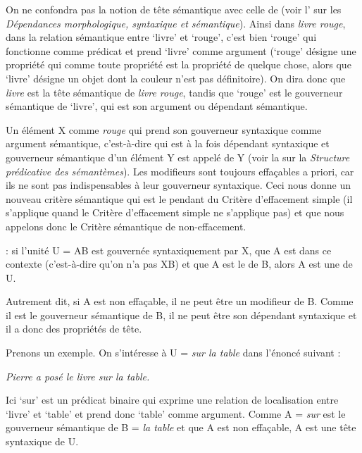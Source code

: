 On ne confondra pas la notion de tête sémantique avec celle de  (voir l’ sur les \textit{Dépendances morphologique, syntaxique et sémantique}). 
Ainsi dans \textit{livre rouge}, dans la relation sémantique entre ‘livre’ et ‘rouge’, c’est bien ‘rouge’ qui fonctionne comme prédicat et prend ‘livre’ comme argument (‘rouge’ désigne une propriété qui comme toute propriété est la propriété de quelque chose, alors que ‘livre’ désigne un objet dont la couleur n’est pas définitoire). On dira donc que \textit{livre} est la tête sémantique de \textit{livre rouge}, tandis que ‘rouge’ est le gouverneur sémantique de ‘livre’, qui est son argument ou dépendant sémantique.

Un élément X comme \textit{rouge} qui prend son gouverneur syntaxique comme argument sémantique, c’est-à-dire qui est à la fois dépendant syntaxique et gouverneur sémantique d’un élément Y est appelé  de Y (voir la  sur la \textit{Structure prédicative des sémantèmes}). Les modifieurs sont toujours effaçables a priori, car ils ne sont pas indispensables à leur gouverneur syntaxique. Ceci nous donne un nouveau critère sémantique qui est le pendant du Critère d’effacement simple (il s’applique quand le Critère d’effacement simple ne s’applique pas) et que nous appelons donc le Critère sémantique de non-effacement.

{ : si l’unité U = AB est gouvernée syntaxiquement par X, que A est  dans ce contexte (c'est-à-dire qu'on n'a pas XB)
et que A est le  de B, alors A est une  de U.}

Autrement dit, si A est non effaçable, il ne peut être un modifieur de B. Comme il est le gouverneur sémantique de B, il ne peut être son dépendant syntaxique et il a donc des propriétés de tête.

Prenons un exemple. On s’intéresse à U = \textit{sur la table} dans l’énoncé suivant :

\ea \textit{Pierre a posé le livre sur la table.}\z

Ici ‘sur’ est un prédicat binaire qui exprime une relation de localisation entre ‘livre’ et ‘table’ et prend donc ‘table’ comme argument. Comme A = \textit{sur} est le gouverneur sémantique de B = \textit{la table} et que A est non effaçable, A est une tête syntaxique de U.\largerpage[2]

